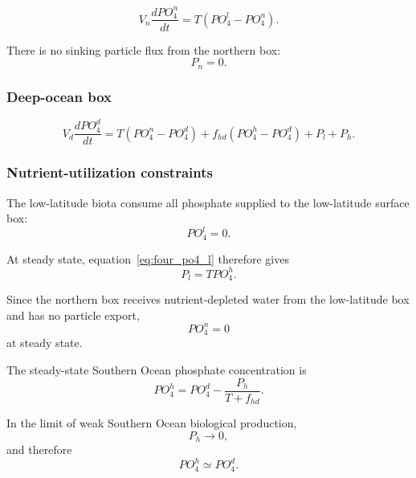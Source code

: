 \documentclass[11pt]{article}
\begin{document}
\begin{equation}
V_n\frac{dPO_4^n}{dt}
=
T\left(PO_4^l-PO_4^n\right).
\label{eq:four_po4_n}
\end{equation}

There is no sinking particle flux from the northern box:
\begin{equation}
P_n=0.
\label{eq:four_Pn_zero}
\end{equation}

\subsubsection{Deep-ocean box}

\begin{equation}
V_d\frac{dPO_4^d}{dt}
=
T\left(PO_4^n-PO_4^d\right)
+
f_{hd}\left(PO_4^h-PO_4^d\right)
+
P_l+P_h.
\label{eq:four_po4_d}
\end{equation}

\subsubsection{Nutrient-utilization constraints}

The low-latitude biota consume all phosphate supplied to
the low-latitude surface box:
\begin{equation}
PO_4^l=0.
\label{eq:four_po4_l_zero}
\end{equation}

At steady state, equation~\eqref{eq:four_po4_l} therefore gives
\begin{equation}
P_l=TPO_4^h.
\label{eq:four_Pl_constraint}
\end{equation}

Since the northern box receives nutrient-depleted water from
the low-latitude box and has no particle export,
\begin{equation}
PO_4^n=0
\label{eq:four_po4_n_zero}
\end{equation}
at steady state.

The steady-state Southern Ocean phosphate concentration is
\begin{equation}
PO_4^h
=
PO_4^d
-
\frac{P_h}{T+f_{hd}}.
\label{eq:four_po4_h_steady}
\end{equation}

In the limit of weak Southern Ocean biological production,
\begin{equation}
P_h\rightarrow 0,
\end{equation}
and therefore
\begin{equation}
PO_4^h\simeq PO_4^d.
\label{eq:four_po4_h_weak_Ph}
\end{equation}
\end{document}
